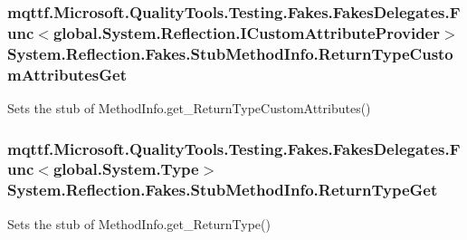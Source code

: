 \hypertarget{class_system_1_1_reflection_1_1_fakes_1_1_stub_method_info_ab67e101e89c1c400730817cda6b1ed7f}{
\subsubsection[{Return\-Type\-Custom\-Attributes\-Get}]{\setlength{\rightskip}{0pt plus 5cm}mqttf.\-Microsoft.\-Quality\-Tools.\-Testing.\-Fakes.\-Fakes\-Delegates.\-Func$<$global.\-System.\-Reflection.\-I\-Custom\-Attribute\-Provider$>$ System.\-Reflection.\-Fakes.\-Stub\-Method\-Info.\-Return\-Type\-Custom\-Attributes\-Get}}\label{class_system_1_1_reflection_1_1_fakes_1_1_stub_method_info_ab67e101e89c1c400730817cda6b1ed7f}


Sets the stub of Method\-Info.\-get\-\_\-\-Return\-Type\-Custom\-Attributes()

\hypertarget{class_system_1_1_reflection_1_1_fakes_1_1_stub_method_info_af481b3b8dbe517c72430b0aa66a55a6b}{
\subsubsection[{Return\-Type\-Get}]{\setlength{\rightskip}{0pt plus 5cm}mqttf.\-Microsoft.\-Quality\-Tools.\-Testing.\-Fakes.\-Fakes\-Delegates.\-Func$<$global.\-System.\-Type$>$ System.\-Reflection.\-Fakes.\-Stub\-Method\-Info.\-Return\-Type\-Get}}\label{class_system_1_1_reflection_1_1_fakes_1_1_stub_method_info_af481b3b8dbe517c72430b0aa66a55a6b}


Sets the stub of Method\-Info.\-get\-\_\-\-Return\-Type()



